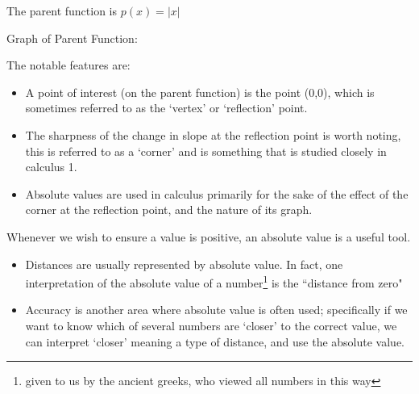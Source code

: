 \documentclass{ximeraXloud}
\begin{document}
        \begin{description}
            \item[Parent Function:] The parent function is $p(x) = |x|$\\
            \begin{minipage}{\textwidth}\item[Graph of Parent Function:]\hspace*{0pt} \\
                \begin{center}
                \end{center}
            \end{minipage}
            \item[Notable Features of Graph:] The notable features are:
            \begin{itemize}
                \item A point of interest (on the parent function) is the point (0,0), which is sometimes referred to as the `vertex' or `reflection' point.
                \item The sharpness of the change in slope at the reflection point is worth noting, this is referred to as a `corner' and is something that is studied closely in calculus 1.
                \item Absolute values are used in calculus primarily for the sake of the effect of the corner at the reflection point, and the nature of its graph.
            \end{itemize}
            \item[Example usage:] Whenever we wish to ensure a value is positive, an absolute value is a useful tool.
            \begin{itemize}
                \item Distances are usually represented by absolute value. In fact, one interpretation of the absolute value of a number\footnote{given to us by the ancient greeks, who viewed all numbers in this way} is the ``distance from zero"
                \item Accuracy is another area where absolute value is often used; specifically if we want to know which of several numbers are `closer' to the correct value, we can interpret `closer' meaning a type of distance, and use the absolute value.
            \end{itemize}
        \end{description}
        
\end{document}
